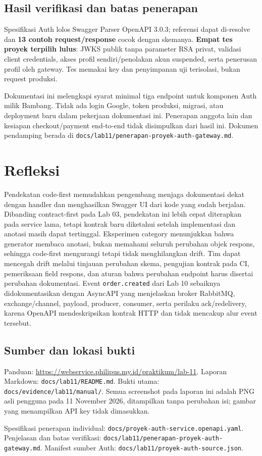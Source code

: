 \documentclass[12pt,a4paper]{article}
\newcommand{\code}[1]{{\small\nolinkurl{#1}}}
\begin{document}
\subsection{Hasil verifikasi dan batas penerapan}
Spesifikasi Auth lolos Swagger Parser OpenAPI 3.0.3; referensi dapat di-resolve dan \textbf{13 contoh request/response} cocok dengan skemanya. \textbf{Empat tes proyek terpilih lulus}: JWKS publik tanpa parameter RSA privat, validasi client credentials, akses profil sendiri/penolakan akun suspended, serta penerusan profil oleh gateway. Tes memakai key dan penyimpanan uji terisolasi, bukan request produksi.

Dokumentasi ini melengkapi syarat minimal tiga endpoint untuk komponen Auth milik Bambang. Tidak ada login Google, token produksi, migrasi, atau deployment baru dalam pekerjaan dokumentasi ini. Penerapan anggota lain dan kesiapan checkout/payment end-to-end tidak disimpulkan dari hasil ini. Dokumen pendamping berada di \code{docs/lab11/penerapan-proyek-auth-gateway.md}.

\clearpage
\section{Refleksi}
Pendekatan code-first memudahkan pengembang menjaga dokumentasi dekat dengan handler dan menghasilkan Swagger UI dari kode yang sudah berjalan. Dibanding contract-first pada Lab 03, pendekatan ini lebih cepat diterapkan pada service lama, tetapi kontrak baru diketahui setelah implementasi dan anotasi masih dapat tertinggal. Eksperimen category menunjukkan bahwa generator membaca anotasi, bukan memahami seluruh perubahan objek respons, sehingga code-first mengurangi tetapi tidak menghilangkan drift. Tim dapat mencegah drift melalui tinjauan perubahan skema, pengujian kontrak pada CI, pemeriksaan field respons, dan aturan bahwa perubahan endpoint harus disertai perubahan dokumentasi. Event \code{order.created} dari Lab 10 sebaiknya didokumentasikan dengan AsyncAPI yang menjelaskan broker RabbitMQ, exchange/channel, payload, producer, consumer, serta perilaku ack/redelivery, karena OpenAPI mendeskripsikan kontrak HTTP dan tidak mencakup alur event tersebut.

\subsection*{Sumber dan lokasi bukti}
Panduan: \url{https://webservice.philipus.my.id/praktikum/lab-11}. Laporan Markdown: \code{docs/lab11/README.md}. Bukti utama: \code{docs/evidence/lab11/manual/}. Semua screenshot pada laporan ini adalah PNG asli pengguna pada 11 November 2026, ditampilkan tanpa perubahan isi; gambar yang menampilkan API key tidak dimasukkan.

Spesifikasi penerapan individual: \code{docs/proyek-auth-service.openapi.yaml}. Penjelasan dan batas verifikasi: \code{docs/lab11/penerapan-proyek-auth-gateway.md}. Manifest sumber Auth: \code{docs/lab11/proyek-auth-source.json}.
\end{document}
